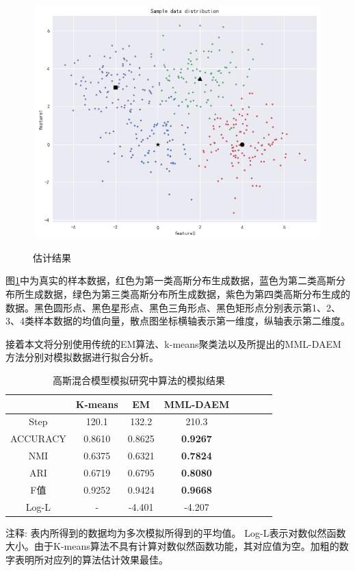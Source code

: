 \documentclass[a4paper,12pt,openany,oneside,utf-8]{ctexbook}
\begin{document}
	\begin{figure}[H]
	\centering
	\includegraphics[width=140mm,height=90mm]{figure/1.4.png}\\
	\caption{估计结果}\label{f3}
    \end{figure}
    
	图\ref{f3}中为真实的样本数据，红色为第一类高斯分布生成数据，蓝色为第二类高斯分布所生成数据，绿色为第三类高斯分布所生成数据，紫色为第四类高斯分布生成的数据。黑色圆形点、黑色星形点、黑色三角形点、黑色矩形点分别表示第1、2、3、4类样本数据的均值向量，散点图坐标横轴表示第一维度，纵轴表示第二维度。
	
	接着本文将分别使用传统的EM算法、k-means聚类法以及所提出的MML-DAEM方法分别对模拟数据进行拟合分析。
	
	\begin{table}[H]  
		\centering
		\caption{高斯混合模型模拟研究中算法的模拟结果}
		\label{tab4}
		\medskip
		\begin{tabular}{c ccccccc}
			\hline  %
			& K-means & EM & MML-DAEM &\\
			\hline
			Step & 120.1 & 132.2 &210.3 &\\
			ACCURACY      & 0.8610 & 0.8625      & \textbf{0.9267}      &\\
			NMI          & 0.6375 & 0.6321    & \textbf{0.7824}     &\\
			ARI           & 0.6719         & 0.6795              & \textbf{0.8080}             &\\
            F值   &0.9252 &0.9424 &\textbf{0.9668} &\\
            Log-L &- &-4.401 &-4.207 &\\
			\hline
		\end{tabular}
		\begin{tablenotes}
			\footnotesize
			\item 注释: 表内所得到的数据均为多次模拟所得到的平均值。 Log-L表示对数似然函数大小。由于K-means算法不具有计算对数似然函数功能，其对应值为空。加粗的数字表明所对应列的算法估计效果最佳。
		\end{tablenotes}
	\end{table}
	
\end{document}
